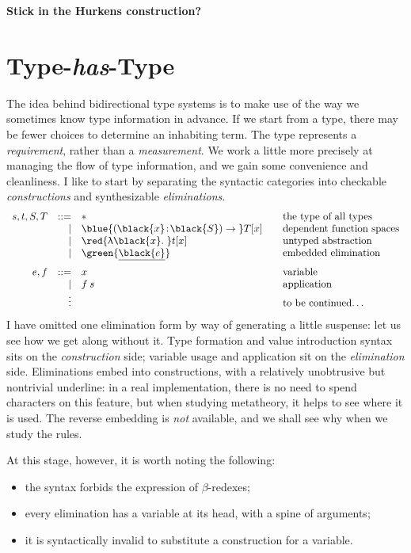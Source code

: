 \documentclass[natbib]{article}
\newcommand{\type}{\ast}
\newcommand{\hb}{\!:\!}
\newcommand{\PI}[2]{\blue{(\black{#1}\hb \black{#2})\to\;}}
\newcommand{\LA}[1]{\red{\uplambda\black{#1}.\;}}
\begin{document}
\textbf{Stick in the Hurkens construction?}


\section{Type-\emph{has}-Type}

\newcommand{\CHK}[3]{#1 \vdash #2 \ni #3}
\newcommand{\SYN}[3]{#1 \vdash #2 \in #3}
\newcommand{\el}[1]{\green{\underline{\black{#1}}}}

The idea behind bidirectional type systems is to make use of the way we sometimes know type information in advance. If we start from a type, there may be fewer choices to determine an inhabiting term. The type represents a \emph{requirement}, rather than a \emph{measurement}. We work a little more precisely at managing the flow of type information, and we gain some convenience and cleanliness. I like to start by separating the syntactic categories into checkable \emph{constructions} and synthesizable \emph{eliminations}.
\[\begin{array}{rrl@{\qquad}l}
s,t,S,T & ::= & \type & \mbox{the type of all types} \\
        &   | & \PI xS T[x] & \mbox{dependent function spaces} \\
        &   | & \LA x t[x] & \mbox{untyped abstraction} \\
        &   | & \el e & \mbox{embedded elimination} \medskip \\
e,f     & ::= & x     & \mbox{variable} \\
        &   | & f\:s  & \mbox{application} \\
        &   \vdots &  & \mbox{to be continued\ldots}
\end{array}\]
I have omitted one elimination form by way of generating a little suspense: let us see how we get along without it. Type formation and value introduction syntax sits on the \emph{construction} side; variable usage and application sit on the \emph{elimination} side. Eliminations embed into constructions, with a relatively unobtrusive but nontrivial underline: in a real implementation, there is no need to spend characters on this feature, but when studying metatheory, it helps to see where it is used. The reverse embedding is \emph{not} available, and we shall see why when we study the rules.

At this stage, however, it is worth noting the following:
\begin{itemize}
\item the syntax forbids the expression of $\beta$-redexes;
\item every elimination has a variable at its head, with a spine of arguments;
\item it is syntactically invalid to substitute a construction for a variable.
\end{itemize}
\end{document}
